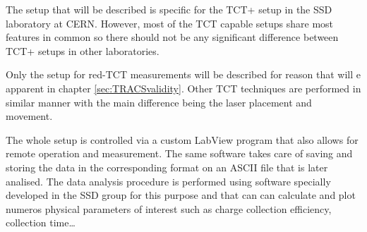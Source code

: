 The setup that will be described is specific for the TCT+ setup in the SSD laboratory at CERN. However, most of the TCT capable setups share most features in common so there should not be any significant difference between TCT+ setups in other laboratories. 

Only the setup for red-TCT measurements will be described for reason that will e apparent in chapter \ref{sec:TRACSvalidity}. Other TCT techniques are performed in similar manner with the main difference being the laser placement and movement.



The whole setup is controlled via a custom LabView\cite{labview} program that also allows for remote operation and measurement. The same software takes care of saving and storing the data in the corresponding format on an ASCII file that is later analised. The data analysis procedure is performed using software specially developed in the SSD group for this purpose and that can can calculate and plot numeros physical parameters of interest such as charge collection efficiency, collection time\ldots






 

